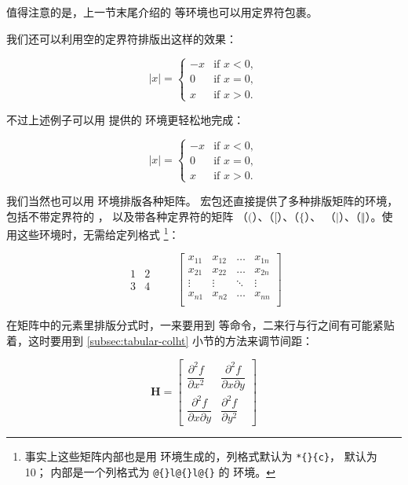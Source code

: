 值得注意的是，上一节末尾介绍的  等环境也可以用定界符包裹。

我们还可以利用空的定界符排版出这样的效果：
\begin{example}
\[ |x| = \left\{
\begin{array}{rl}
-x & \text{if } x < 0,\\
0 & \text{if } x = 0,\\
x & \text{if } x > 0.
\end{array} \right. \]
\end{example}

不过上述例子可以用  提供的  环境更轻松地完成：
\begin{example}
\[ |x| =
\begin{cases}
-x & \text{if } x < 0,\\
0 & \text{if } x = 0,\\
x & \text{if } x > 0.
\end{cases} \]
\end{example}

我们当然也可以用  环境排版各种矩阵。 宏包还直接提供了多种排版矩阵的环境，包括不带定界符的 ，
以及带各种定界符的矩阵 （$\bigl($）、（$\bigl[$）、（$\bigl\{$）、
（$\bigl\vert$）、（$\bigl\Vert$）。使用这些环境时，无需给定列格式%
\footnote{事实上这些矩阵内部也是用  环境生成的，列格式默认为 \texttt{*\{\}\{c\}}， 默认为 10；
 内部是一个列格式为 \texttt{@\{\}l@\{\}l@\{\}} 的  环境。}：
\begin{example}
\[
\begin{matrix}
1 & 2 \\ 3 & 4
\end{matrix} \qquad
\begin{bmatrix}
x_{11} & x_{12} & \ldots & x_{1n}\\
x_{21} & x_{22} & \ldots & x_{2n}\\
\vdots & \vdots & \ddots & \vdots\\
x_{n1} & x_{n2} & \ldots & x_{nn}\\
\end{bmatrix}
\]
\end{example}

在矩阵中的元素里排版分式时，一来要用到  等命令，二来行与行之间有可能紧贴着，这时要用到
\ref{subsec:tabular-colht} 小节的方法来调节间距：
\begin{example}
\[
\mathbf{H}=
\begin{bmatrix}
\dfrac{\partial^2 f}{\partial x^2} &
\dfrac{\partial^2 f}
      {\partial x \partial y} \\[8pt]
\dfrac{\partial^2 f}
      {\partial x \partial y} &
\dfrac{\partial^2 f}{\partial y^2}
\end{bmatrix}
\]
\end{example}

